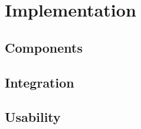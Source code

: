 \chapter{Implementation}
\label{chap-five}

\section{Components}

\section{Integration}

\section{Usability}